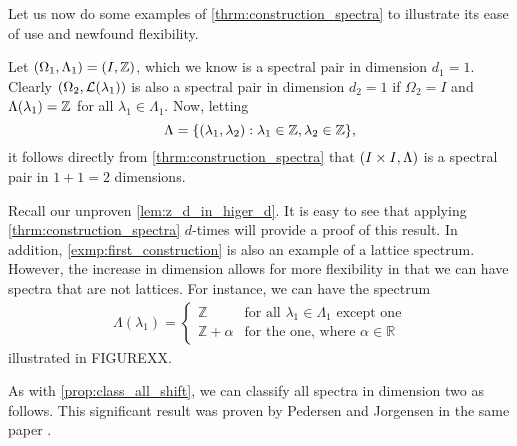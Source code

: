 \documentclass[../thesis.tex]{subfiles}
\begin{document}
Let us now do some examples of \cref{thrm:construction_spectra} to illustrate its ease of use and newfound flexibility. 
\begin{example}\label{exmp:first_construction}
    Let $(\Omega_1,\Lambda_1)=(I, \mathbb{Z})$, which we know is a spectral pair in dimension $d_1=1$. Clearly $(\Omega_2,\mathcal{L}(\lambda_1))$ is also a spectral pair in dimension $d_2=1$ if $\Omega_2=I$ and $\Lambda(\lambda_1) = \mathbb{Z}$ for all $\lambda_1 \in \Lambda_1$. Now, letting 
    \begin{equation}\label{eq:first_construction}
        \Lambda  = \{(\lambda_1,\lambda_2): \lambda_1 \in \mathbb{Z}, \lambda_2 \in \mathbb{Z} \},
    \end{equation}
    it follows directly from \cref{thrm:construction_spectra} that $(I \times I, \Lambda)$ is a spectral pair in $1+1=2$ dimensions.
\end{example}

Recall our unproven \cref{lem:z_d_in_higer_d}. It is easy to see that applying \cref{thrm:construction_spectra} $d$-times will provide a proof of this result. In addition, \cref{exmp:first_construction} is also an example of a lattice spectrum. %
However, the increase in dimension allows for more flexibility in that we can have spectra that are not lattices. For instance, we can have the spectrum 
\begin{align*}
    \Lambda(\lambda_1) = \begin{cases}        
        \mathbb{Z} & \text{for all } \lambda_1 \in \Lambda_1 \text{ except one}\\        
        \mathbb{Z}+\alpha & \text{for the one, where } \alpha \in \mathbb{R}   
    \end{cases}
\end{align*}
illustrated in FIGUREXX.



As with \cref{prop:class_all_shift}, we can classify all spectra in dimension two as follows. This significant result was proven by Pedersen and Jorgensen in the same paper \cite{jorgensenSpectralPairsCartesian2001}. 
\end{document}
